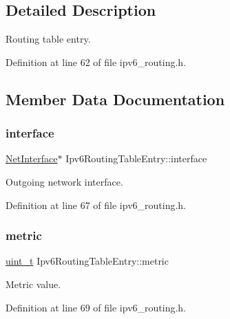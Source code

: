 \subsection{Detailed Description}
Routing table entry. 

Definition at line 62 of file ipv6\+\_\+routing.\+h.



\subsection{Member Data Documentation}
\mbox{\label{structIpv6RoutingTableEntry_ab13eefd552d99929780012e98e026a7d}} 
\subsubsection{\texorpdfstring{interface}{interface}}
{\footnotesize\ttfamily \hyperlink{net_8h_a2234db8911a1148c9159979d8f5e0d6b}{Net\+Interface}$\ast$ Ipv6\+Routing\+Table\+Entry\+::interface}



Outgoing network interface. 



Definition at line 67 of file ipv6\+\_\+routing.\+h.

\mbox{\label{structIpv6RoutingTableEntry_a71c00d6422a11d1c5b060dcbd8f4f2c5}} 
\subsubsection{\texorpdfstring{metric}{metric}}
{\footnotesize\ttfamily \hyperlink{compiler__port_8h_a12a1e9b3ce141648783a82445d02b58d}{uint\+\_\+t} Ipv6\+Routing\+Table\+Entry\+::metric}



Metric value. 



Definition at line 69 of file ipv6\+\_\+routing.\+h.

\mbox{\label{structIpv6RoutingTableEntry_aca563bb1b384a2dd6eb5f52de10f79bb}} 
